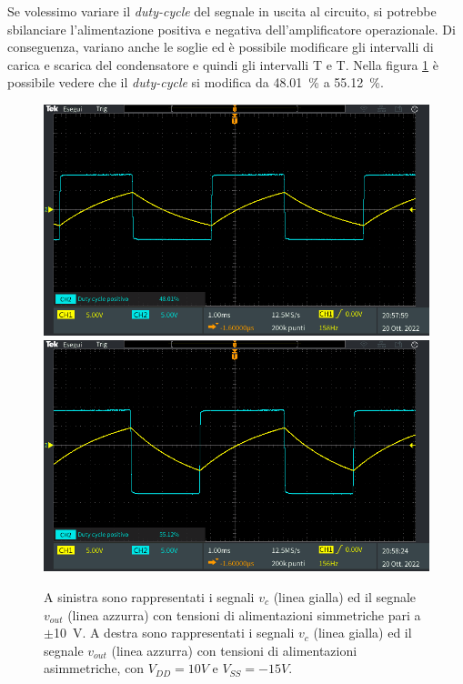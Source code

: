 \noindent
Se volessimo variare il \textit{duty-cycle} del segnale in uscita al circuito, si potrebbe sbilanciare l'alimentazione positiva e negativa dell'amplificatore operazionale. Di conseguenza, variano anche le soglie ed è possibile modificare gli intervalli di carica e scarica del condensatore e quindi gli intervalli T e T. Nella figura \Fig\ref{fig:tensioni_sbilanciare} è possibile vedere che il \textit{duty-cycle} si modifica da \SI{48.01}{\percent} a \SI{55.12}{\percent}.
\begin{figure}[h]
	\centering
	\includegraphics[width=0.496\linewidth]{./ImageFiles/Laboratorio 3/TEK00021.PNG}
	\includegraphics[width=0.496\linewidth]{./ImageFiles/Laboratorio 3/TEK00022.PNG}
	\caption{A sinistra sono rappresentati i segnali $v_{c}$ (linea gialla) ed il segnale $v_{out}$ (linea azzurra) con tensioni di alimentazioni simmetriche pari a $\pm$\SI{10}{\volt}. A destra sono rappresentati i segnali $v_{c}$ (linea gialla) ed il segnale $v_{out}$ (linea azzurra) con tensioni di alimentazioni asimmetriche, con $V_{DD}=10V$ e  $V_{SS}=-15V$.}
	\label{fig:tensioni_sbilanciare}
\end{figure} 

